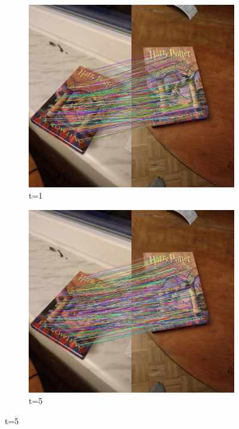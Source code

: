 \documentclass{article}
\begin{document}
	\begin{figure}[H]
		\centering
		\begin{subfigure}[b]{0.4\linewidth}
			\includegraphics[width=\linewidth]{p1m.png}
			\caption{t=1}
		\end{subfigure}
		\begin{subfigure}[b]{0.4\linewidth}
			\includegraphics[width=\linewidth]{p5m.png}
			\caption{t=5}
		\end{subfigure}

\end{figure}
\end{document}
